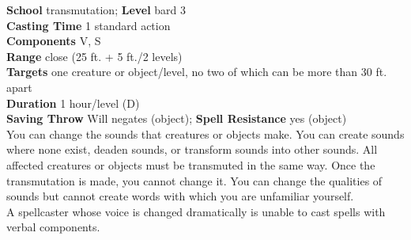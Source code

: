 \textbf{School} transmutation; \textbf{Level} bard 3\\
\textbf{Casting Time} 1 standard action\\
\textbf{Components} V, S\\
\textbf{Range} close (25 ft. + 5 ft./2 levels)\\
\textbf{Targets} one creature or object/level, no two of which can be more than 30 ft. apart\\
\textbf{Duration} 1 hour/level (D)\\
\textbf{Saving Throw }Will negates (object); \textbf{Spell Resistance} yes (object)\\
You can change the sounds that creatures or objects make. You can create sounds where none exist, deaden sounds, or transform sounds into other sounds. All affected creatures or objects must be transmuted in the same way. Once the transmutation is made, you cannot change it. You can change the qualities of sounds but cannot create words with which you are unfamiliar yourself. \\
A spellcaster whose voice is changed dramatically is unable to cast spells with verbal components.\\

